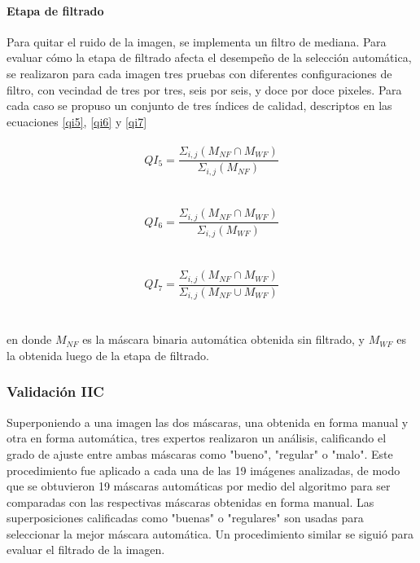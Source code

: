 \paragraph{Etapa de filtrado}
Para quitar el ruido de la imagen, se implementa un filtro de mediana. Para evaluar cómo la etapa de filtrado afecta el desempeño de la selección automática, se realizaron para cada imagen tres pruebas con diferentes configuraciones de filtro, con vecindad de tres por tres, seis por seis, y  doce por doce pixeles. Para cada caso se propuso un conjunto de tres índices de calidad, descriptos en las ecuaciones \ref{qi5}, \ref{qi6} y \ref{qi7}
\\
\\
 \begin{equation}
    QI_5=\frac{\Sigma _{i,j}(M_{NF}\cap M_{WF})}{\Sigma _{i,j}(M_{NF}) }
    \label{qi5}
\end{equation}
\\
\\
 \begin{equation}
    QI_6=\frac{\Sigma_{i,j}(M_{NF}\cap M_{WF})}{\Sigma _{i,j}(M_{WF}) }
    \label{qi6}
\end{equation}
\\
\\
\begin{equation}
    QI_7=\frac{\Sigma _{i,j}(M_{NF}\cap M_{WF})}{\Sigma _{i,j}(M_{NF}\cup M_{WF}) }
    \label{qi7}
\end{equation}
\\
\\
en donde $M_{NF}$ es la máscara binaria automática obtenida sin filtrado, y $M_{WF}$ es la obtenida luego de la etapa de filtrado.

\subsubsection{Validación IIC} \label{Validacion}
Superponiendo a una imagen las dos máscaras, una obtenida en forma manual y otra en forma automática, tres expertos realizaron un análisis, calificando el grado de ajuste entre ambas máscaras como "bueno", "regular" o "malo". Este procedimiento fue aplicado a cada una de las 19 imágenes analizadas, de modo que se obtuvieron 19 máscaras automáticas por medio del algoritmo para ser comparadas con las respectivas máscaras obtenidas en forma manual. Las superposiciones calificadas como "buenas" o "regulares" son usadas para seleccionar la mejor máscara automática. Un procedimiento similar se siguió para evaluar el filtrado de la imagen.

